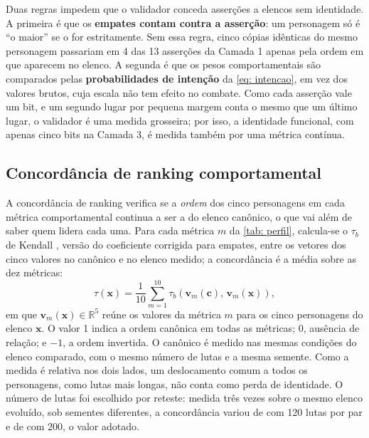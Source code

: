 Duas regras impedem que o validador conceda asserções a elencos sem identidade. A primeira é que os \textbf{empates contam contra a asserção}: um personagem só é ``o maior'' se o for estritamente. Sem essa regra, cinco cópias idênticas do mesmo personagem passariam em 4 das 13 asserções da Camada 1 apenas pela ordem em que aparecem no elenco. A segunda é que os pesos comportamentais são comparados pelas \textbf{probabilidades de intenção} da \autoref{eq: intencao}, em vez dos valores brutos, cuja escala não tem efeito no combate. Como cada asserção vale um bit, e um segundo lugar por pequena margem conta o mesmo que um último lugar, o validador é uma medida grosseira; por isso, a identidade funcional, com apenas cinco bits na Camada 3, é medida também por uma métrica contínua.

\subsection{Concordância de ranking comportamental}
\label{sub: tau}

A concordância de ranking verifica se a \textit{ordem} dos cinco personagens em cada métrica comportamental continua a ser a do elenco canônico, o que vai além de saber quem lidera cada uma. Para cada métrica $m$ da \autoref{tab: perfil}, calcula-se o $\tau_b$ de Kendall \cite{kendall1938new, kendall1945treatment}, versão do coeficiente corrigida para empates, entre os vetores dos cinco valores no canônico e no elenco medido; a concordância é a média sobre as dez métricas:
\begin{equation}
    \label{eq: tau}
    \tau(\mathbf{x}) = \frac{1}{10} \sum_{m=1}^{10} \tau_b\!\left( \mathbf{v}_m(\mathbf{c}),\, \mathbf{v}_m(\mathbf{x}) \right),
\end{equation}
em que $\mathbf{v}_m(\mathbf{x}) \in \mathbb{R}^5$ reúne os valores da métrica $m$ para os cinco personagens do elenco $\mathbf{x}$. O valor 1 indica a ordem canônica em todas as métricas; 0, ausência de relação; e $-1$, a ordem invertida. O canônico é medido nas mesmas condições do elenco comparado, com o mesmo número de lutas e a mesma semente. Como a medida é relativa nos dois lados, um deslocamento comum a todos os personagens, como lutas mais longas, não conta como perda de identidade. O número de lutas foi escolhido por reteste: medida três vezes sobre o mesmo elenco evoluído, sob sementes diferentes, a concordância variou de \tauRetesteCentoVinte{} com 120 lutas por par e de \tauRetesteDuzentas{} com 200, o valor adotado.

